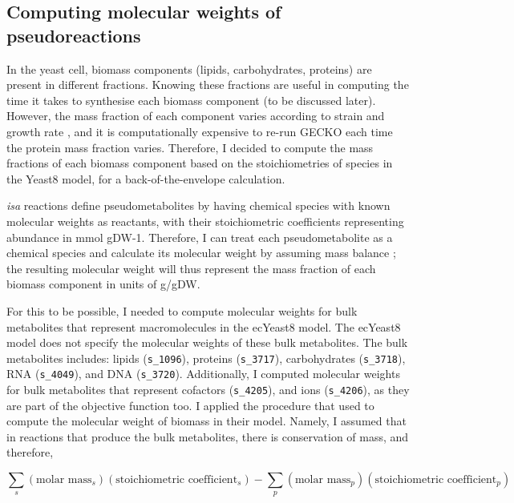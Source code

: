 \subsection{Computing molecular weights of pseudoreactions}
\label{subsec:model-yeast8-molweights}

In the yeast cell, biomass components (lipids, carbohydrates, proteins) are present in different fractions.
Knowing these fractions are useful in computing the time it takes to synthesise each biomass component (to be discussed later).
However, the mass fraction of each component varies according to strain and growth rate \parencite{nilssonMetabolicTradeoffsYeast2016, elsemmanWholecellModelingYeast2022}, and it is computationally expensive to re-run GECKO each time the protein mass fraction varies.
Therefore, I decided to compute the mass fractions of each biomass component based on the stoichiometries of species in the Yeast8 model, for a back-of-the-envelope calculation.

\emph{isa} reactions define pseudometabolites by having chemical species with known molecular weights as reactants, with their stoichiometric coefficients representing abundance in mmol gDW-1.
Therefore, I can treat each pseudometabolite as a chemical species and calculate its molecular weight by assuming mass balance \parencite{chanStandardizingBiomassReactions2017, dinhQuantifyingPropagationParametric2022, takhaveevTemporalSegregationBiosynthetic2023};
the resulting molecular weight will thus represent the mass fraction of each biomass component in units of g/gDW.

For this to be possible, I needed to compute molecular weights for bulk metabolites that represent macromolecules in the ecYeast8 model.
The ecYeast8 model does not specify the molecular weights of these bulk metabolites.
The bulk metabolites includes: lipids (\texttt{s\_1096}), proteins (\texttt{s\_3717}), carbohydrates (\texttt{s\_3718}), RNA (\texttt{s\_4049}), and DNA (\texttt{s\_3720}).
Additionally, I computed molecular weights for bulk metabolites that represent cofactors (\texttt{s\_4205}), and ions (\texttt{s\_4206}), as they are part of the objective function too.
I applied the procedure that \textcite{takhaveevTemporalSegregationBiosynthetic2023} used to compute the molecular weight of biomass in their model.
Namely, I assumed that in reactions that produce the bulk metabolites, there is conservation of mass, and therefore,

\begin{equation}
\label{eq:conservation-of-mass}
    \sum_{s}(\text{molar mass}_{s})(\text{stoichiometric coefficient}_{s}) - \sum_{p}(\text{molar mass}_{p})(\text{stoichiometric coefficient}_{p})
\end{equation}

